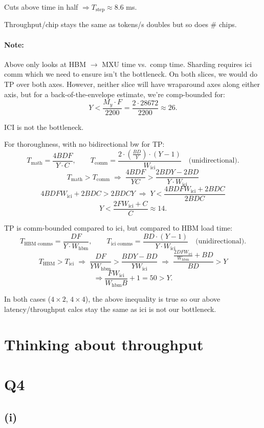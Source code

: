 \documentclass[11pt]{article}
\newcommand{\Tmath}{T_{\text{math}}}
\newcommand{\Tcomm}{T_{\text{comm}}}
\newcommand{\Tstep}{T_{\text{step}}}
\newcommand{\Wici}{W_{\text{ici}}}
\newcommand{\Whbm}{W_{\text{hbm}}}
\begin{document}
Cuts above time in half $\Rightarrow \Tstep \approx 8.6$ ms.

Throughput/chip stays the same as tokens/s doubles but so does \# chips.

\paragraph{Note:} Above only looks at HBM $\to$ MXU time vs.\ comp time. Sharding requires ici comm which we need to ensure isn't the bottleneck. On both slices, we would do TP over both axes. However, neither slice will have wraparound axes along either axis, but for a back-of-the-envelope estimate, we're comp-bounded for:
\[
Y < \frac{M_y \cdot F}{2200} = \frac{2 \cdot 28672}{2200} \approx 26.
\]

ICI is not the bottleneck.

For thoroughness, with no bidirectional bw for TP:
\[
\Tmath = \frac{4BDF}{Y \cdot C}, \qquad \Tcomm = \frac{2 \cdot \left( \frac{BD}{Y} \right) \cdot (Y - 1)}{\Wici} \quad \text{(unidirectional)}.
\]
\[
\Tmath > \Tcomm \;\Rightarrow\; \frac{4BDF}{YC} > \frac{2BDY - 2BD}{Y \cdot \Wici}
\]
\[
4BDF\Wici + 2BDC > 2BDCY \;\Rightarrow\; Y < \frac{4BDF\Wici + 2BDC}{2BDC}
\]
\[
Y < \frac{2F\Wici + C}{C} \approx 14.
\]

TP is comm-bounded compared to ici, but compared to HBM load time:
\[
T_{\text{HBM comms}} = \frac{DF}{Y \cdot \Whbm}, \qquad T_{\text{ici comms}} = \frac{BD \cdot (Y - 1)}{Y \cdot \Wici} \quad \text{(unidirectional)}.
\]
\[
T_{\text{HBM}} > T_{\text{ici}} \;\Rightarrow\; \frac{DF}{Y\Whbm} > \frac{BDY - BD}{Y\Wici} \;\Rightarrow\; \frac{\frac{2DF\Wici}{\Whbm} + BD}{BD} > Y
\]
\[
\Rightarrow \frac{F\Wici}{\Whbm B} + 1 = 50 > Y.
\]

In both cases ($4 \times 2$, $4 \times 4$), the above inequality is true so our above latency/throughput calcs stay the same as ici is not our bottleneck.

\section*{Thinking about throughput}

\section*{Q4}

\subsection*{(i)}
\end{document}

